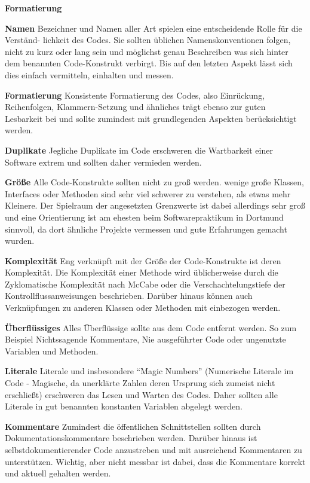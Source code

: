 \documentclass[da,ngerman]{stthesis}
\begin{document}
				\begin{labeling}{\textbf{Formatierung}}
					\item [\textbf{Namen}] Bezeichner und Namen aller Art spielen eine entscheidende Rolle für die Verständ- lichkeit des Codes. Sie sollten üblichen Namenskonventionen folgen, nicht zu kurz oder lang sein und möglichst genau Beschreiben was sich hinter dem benannten Code-Konstrukt verbirgt. Bis auf den letzten Aspekt lässt sich dies einfach vermitteln, einhalten und messen.
					\item [\textbf{Formatierung}] Konsistente Formatierung des Codes, also Einrückung, Reihenfolgen, Klammern-Setzung und ähnliches trägt ebenso zur guten Lesbarkeit bei und sollte zumindest mit grundlegenden Aspekten berücksichtigt werden.  
					\item [\textbf{Duplikate}] Jegliche Duplikate im Code erschweren die Wartbarkeit einer Software extrem und sollten daher vermieden werden. 
					\item [\textbf{Größe}] Alle Code-Konstrukte sollten nicht zu groß werden. wenige große Klassen, Interfaces oder Methoden sind sehr viel schwerer zu verstehen, als etwas mehr Kleinere. Der Spielraum der angesetzten Grenzwerte ist dabei allerdings sehr groß und eine Orientierung ist am ehesten beim Softwarepraktikum in Dortmund sinnvoll, da dort ähnliche Projekte vermessen und gute Erfahrungen gemacht wurden.
					\item [\textbf{Komplexität}] Eng verknüpft mit der Größe der Code-Konstrukte ist deren Komplexität. Die Komplexität einer Methode wird üblicherweise durch die Zyklomatische Komplexität nach McCabe \cite{AComplexityMeasure} oder die Verschachtelungstiefe der Kontrollflussanweisungen beschrieben. Darüber hinaus können auch Verknüpfungen zu anderen Klassen oder Methoden mit einbezogen werden.
					\item [\textbf{Überflüssiges}] Alles Überflüssige sollte aus dem Code entfernt werden. So zum Beispiel Nichtssagende Kommentare, Nie ausgeführter Code oder ungenutzte Variablen und Methoden. 
					\item [\textbf{Literale}] Literale und insbesondere "`Magic Numbers"' (Numerische Literale im Code - Magische, da unerklärte Zahlen deren Ursprung sich zumeist nicht erschließt) erschweren das Lesen und Warten des Codes. Daher sollten alle Literale in gut benannten konstanten Variablen abgelegt werden.	
					\item [\textbf{Kommentare}]	Zumindest die öffentlichen Schnittstellen sollten durch Dokumentationskommentare beschrieben werden. Darüber hinaus ist selbstdokumentierender Code anzustreben und mit ausreichend Kommentaren zu unterstützen. Wichtig, aber nicht messbar ist dabei, dass die Kommentare korrekt und aktuell gehalten werden.			
				\end{labeling}
\end{document}
